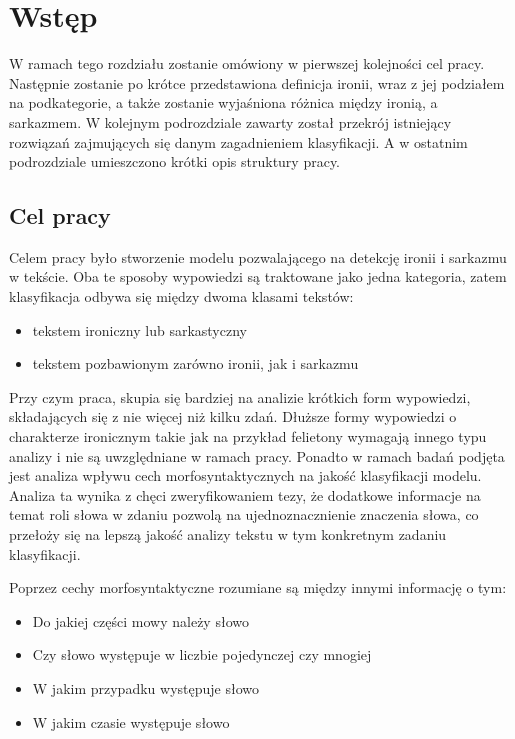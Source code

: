 \newpage %
\section{Wstęp}

W ramach tego rozdziału zostanie omówiony w pierwszej kolejności cel pracy. Następnie zostanie po krótce przedstawiona definicja ironii, wraz z jej podziałem na podkategorie, a także zostanie wyjaśniona różnica między ironią, a sarkazmem. W kolejnym podrozdziale zawarty został przekrój istniejący rozwiązań zajmujących się danym zagadnieniem klasyfikacji. A w ostatnim podrozdziale umieszczono krótki opis struktury pracy. 

\subsection{Cel pracy}

Celem pracy było stworzenie modelu pozwalającego na detekcję ironii i sarkazmu w tekście. Oba te sposoby wypowiedzi są traktowane jako jedna kategoria, zatem klasyfikacja odbywa się między dwoma klasami tekstów:

\begin{itemize}
    \item tekstem ironiczny lub sarkastyczny
    \item tekstem pozbawionym zarówno ironii, jak i sarkazmu
\end{itemize}

\noindent Przy czym praca, skupia się bardziej na analizie krótkich form wypowiedzi, składających się z nie więcej niż kilku zdań. Dłuższe formy wypowiedzi o charakterze ironicznym takie jak na przykład felietony wymagają innego typu analizy i nie są uwzględniane w ramach pracy. Ponadto w ramach badań podjęta jest analiza wpływu cech morfosyntaktycznych na jakość klasyfikacji modelu. Analiza ta wynika z chęci zweryfikowaniem tezy, że dodatkowe informacje na temat roli słowa w zdaniu pozwolą na ujednoznacznienie znaczenia słowa, co przełoży się na lepszą jakość analizy tekstu w tym konkretnym zadaniu klasyfikacji.

\noindent Poprzez cechy morfosyntaktyczne rozumiane są między innymi informację o tym\cite[]{Radziszewski2012}:
\begin{itemize}
    \item Do jakiej części mowy należy słowo
    \item Czy słowo występuje w liczbie pojedynczej czy mnogiej
    \item W jakim przypadku występuje słowo
    \item W jakim czasie występuje słowo
\end{itemize}





